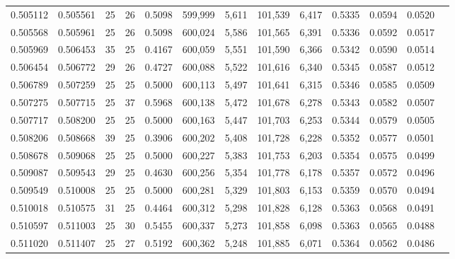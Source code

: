 \begin{tabular}{rrrrrrrrrrrrr}
0.505112 & 0.505561 &    25 &  26 &                                     0.5098 & 599,999 &   5,611 & 101,539 &   6,417 & 0.5335 & 0.0594 & 0.0520 \\
0.505568 & 0.505961 &    25 &  26 &                                     0.5098 & 600,024 &   5,586 & 101,565 &   6,391 & 0.5336 & 0.0592 & 0.0517 \\
0.505969 & 0.506453 &    35 &  25 &                                     0.4167 & 600,059 &   5,551 & 101,590 &   6,366 & 0.5342 & 0.0590 & 0.0514 \\
0.506454 & 0.506772 &    29 &  26 &                                     0.4727 & 600,088 &   5,522 & 101,616 &   6,340 & 0.5345 & 0.0587 & 0.0512 \\
0.506789 & 0.507259 &    25 &  25 &                                     0.5000 & 600,113 &   5,497 & 101,641 &   6,315 & 0.5346 & 0.0585 & 0.0509 \\
0.507275 & 0.507715 &    25 &  37 &                                     0.5968 & 600,138 &   5,472 & 101,678 &   6,278 & 0.5343 & 0.0582 & 0.0507 \\
0.507717 & 0.508200 &    25 &  25 &                                     0.5000 & 600,163 &   5,447 & 101,703 &   6,253 & 0.5344 & 0.0579 & 0.0505 \\
0.508206 & 0.508668 &    39 &  25 &                                     0.3906 & 600,202 &   5,408 & 101,728 &   6,228 & 0.5352 & 0.0577 & 0.0501 \\
0.508678 & 0.509068 &    25 &  25 &                                     0.5000 & 600,227 &   5,383 & 101,753 &   6,203 & 0.5354 & 0.0575 & 0.0499 \\
0.509087 & 0.509543 &    29 &  25 &                                     0.4630 & 600,256 &   5,354 & 101,778 &   6,178 & 0.5357 & 0.0572 & 0.0496 \\
0.509549 & 0.510008 &    25 &  25 &                                     0.5000 & 600,281 &   5,329 & 101,803 &   6,153 & 0.5359 & 0.0570 & 0.0494 \\
0.510018 & 0.510575 &    31 &  25 &                                     0.4464 & 600,312 &   5,298 & 101,828 &   6,128 & 0.5363 & 0.0568 & 0.0491 \\
0.510597 & 0.511003 &    25 &  30 &                                     0.5455 & 600,337 &   5,273 & 101,858 &   6,098 & 0.5363 & 0.0565 & 0.0488 \\
0.511020 & 0.511407 &    25 &  27 &                                     0.5192 & 600,362 &   5,248 & 101,885 &   6,071 & 0.5364 & 0.0562 & 0.0486 \\

\end{tabular}
